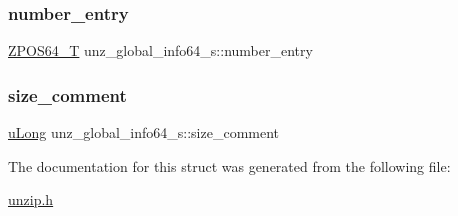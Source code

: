 \mbox{\label{structunz__global__info64__s_a628f94ac445f2a6cd64c9e82d481e738}} 
\subsubsection{\texorpdfstring{number\+\_\+entry}{number\_entry}}
{\footnotesize\ttfamily \hyperlink{ioapi_8h_afffed08ed7f2413fa38e12a223ae0e72}{Z\+P\+O\+S64\+\_\+T} unz\+\_\+global\+\_\+info64\+\_\+s\+::number\+\_\+entry}

\mbox{\label{structunz__global__info64__s_ad9440fb3b019cfdac9ba8b8d83026ffc}} 
\subsubsection{\texorpdfstring{size\+\_\+comment}{size\_comment}}
{\footnotesize\ttfamily \hyperlink{ioapi_8h_a50e9e9d5c30e481de822ad68fe537986}{u\+Long} unz\+\_\+global\+\_\+info64\+\_\+s\+::size\+\_\+comment}



The documentation for this struct was generated from the following file\+:\begin{DoxyCompactItemize}
\item 
\hyperlink{unzip_8h}{unzip.\+h}\end{DoxyCompactItemize}
